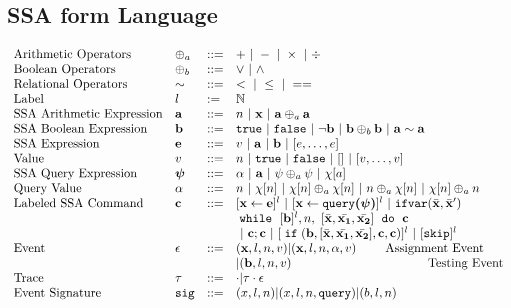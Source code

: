 %
%
\subsection{SSA form Language}
\[
\begin{array}{llll}
 \mbox{Arithmetic Operators} 
& \oplus_a & ::= & + ~|~ - ~|~ \times 
%
~|~ \div \\  
\mbox{Boolean Operators} 
& \oplus_b & ::= & \lor ~|~ \land
\\
\mbox{Relational Operators} 
& \sim & ::= & < ~|~ \leq ~|~ == 
\\  
%
\mbox{Label} 
& l & := & \mathbb{N} 
\\ 
%
\mbox{SSA Arithmetic Expression} 
& \saexpr & ::= & 
n ~|~ \ssa{x} ~|~ \saexpr \oplus_a \saexpr  
\\
%
\mbox{SSA Boolean Expression} & \sbexpr & ::= & 
	\etrue ~|~ \efalse  ~|~ \neg \sbexpr
	 ~|~ \sbexpr \oplus_b \sbexpr
	~|~ \saexpr \sim \saexpr 
	\\
%
\mbox{SSA Expression} & \sexpr & ::= & v ~|~ \saexpr \sep \sbexpr ~|~ [\expr, \dots, \expr]
\\  
%
\mbox{Value} 
& v & ::= & { n \sep \etrue \sep \efalse ~|~ [] ~|~ [v, \dots, v]}  
\\
%
\mbox{SSA Query Expression} 
& \ssa{\qexpr} & ::= 
& { \qval ~|~ \saexpr ~|~ \qexpr \oplus_a \qexpr ~|~ \chi[\aexpr]} 
\\
%
\mbox{Query Value} & \qval & ::= 
& {n ~|~ \chi[n] ~|~ \chi[n] \oplus_a  \chi[n] ~|~ n \oplus_a  \chi[n]
~|~ \chi[n] \oplus_a  n}
\\
%
\mbox{Labeled SSA Command} 
& \ssa{c} & ::= &   [\assign {\ssa{x}}{ \ssa{\expr}}]^{l} ~|~  [\assign {\ssa{x} } {\ssa{\query(\qexpr)}}]^{l}
%
~|~  {{\eifvar(\bar{\ssa{x}}, \bar{\ssa{x}}')}} 
%
\\ 
&&& 
{\ewhile ~ [ \sbexpr ]^{l} , n,
~ 
[\bar{\ssa{x}}, \bar{\ssa{x_1}}, \bar{\ssa{x_2}}] 
~ \edo ~  \ssa{c} }
\\
&&&
~|~ \ssa{c};\ssa{c}  
~|~ [\eif(\sbexpr, [\bar{\ssa{x}}, \bar{\ssa{x_1}}, \bar{\ssa{x_2}}] , \ssa{c}, \ssa{c})]^l 
~|~ [\eskip]^{l} 
\\
%
\mbox{Event} 
& \event & ::= & 
      (\ssa{x}, l, n, v) | (\ssa{x}, l, n, \qval, v)  ~~~~~~~ \mbox{Assignment Event} \\
&&& | (\sbexpr, l, n, v)   ~~~~~~~~~~~~~~~~~~~~~~~~~~~~~~~~~ \mbox{Testing Event}
\\
%
\mbox{Trace} & \vtrace
& ::= & \cdot | \vtrace \cdot \event
\\
%
\mbox{Event Signature} & \sig
& ::= & (x, l, n) | (x, l, n, \query) | (b, l, n)
\end{array}
\]
